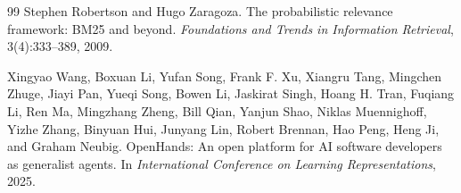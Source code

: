 \documentclass[11pt,a4paper]{article}
\begin{document}
\begin{thebibliography}{99}
Stephen Robertson and Hugo Zaragoza.
\newblock The probabilistic relevance framework: BM25 and beyond.
\newblock \emph{Foundations and Trends in Information Retrieval}, 3(4):333--389,
2009.

Xingyao Wang, Boxuan Li, Yufan Song, Frank F. Xu, Xiangru Tang, Mingchen Zhuge,
Jiayi Pan, Yueqi Song, Bowen Li, Jaskirat Singh, Hoang H. Tran, Fuqiang Li,
Ren Ma, Mingzhang Zheng, Bill Qian, Yanjun Shao, Niklas Muennighoff, Yizhe
Zhang, Binyuan Hui, Junyang Lin, Robert Brennan, Hao Peng, Heng Ji, and Graham
Neubig.
\newblock OpenHands: An open platform for AI software developers as generalist
agents.
\newblock In \emph{International Conference on Learning Representations}, 2025.

\end{thebibliography}
\end{document}
